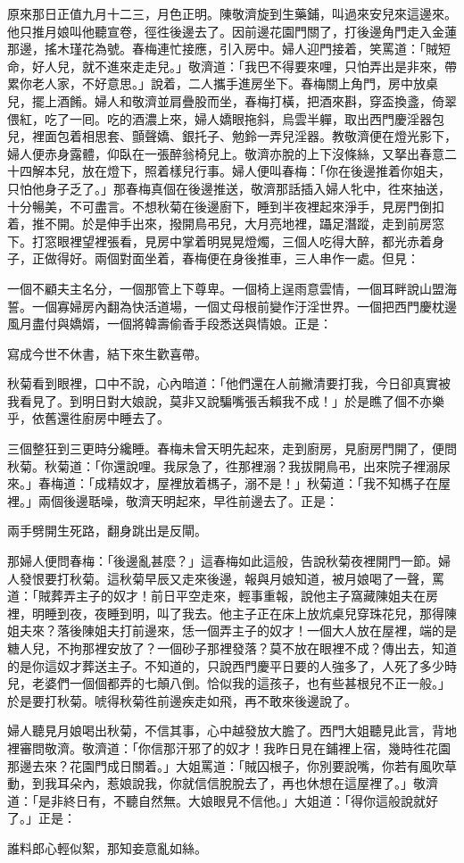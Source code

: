 原來那日正值九月十二三，月色正明。陳敬濟旋到生藥鋪，叫過來安兒來這邊來。他只推月娘叫他聽宣卷，徑徃後邊去了。因前邊花園門關了，打後邊角門走入金蓮那邊，搖木瑾花為號。春梅連忙接應，引入房中。婦人迎門接着，笑罵道：「賊短命，好人兒，就不進來走走兒。」敬濟道：「我巴不得要來哩，只怕弄出是非來，帶累你老人家，不好意思。」說着，二人攜手進房坐下。春梅關上角門，房中放桌兒，擺上酒餚。婦人和敬濟並肩疊股而坐，春梅打橫，把酒來斟，穿盃換盞，倚翠偎紅，吃了一囘。吃的酒濃上來，婦人嬌眼拖斜，烏雲半軃，取出西門慶淫器包兒，裡面包着相思套、顫聲嬌、銀托子、勉鈴一弄兒淫器。{}教敬濟便在燈光影下，婦人便赤身露體，仰臥在一張醉翁椅兒上。敬濟亦脫的上下沒條絲，又拏出春意二十四解本兒，放在燈下，照着樣兒行事。婦人便叫春梅：「你在後邊推着你姐夫，只怕他身子乏了。」那春梅真個在後邊推送，敬濟那話插入婦人牝中，徃來抽送，十分暢美，不可盡言。不想秋菊在後邊廚下，睡到半夜裡起來淨手，見房門倒扣着，推不開。於是伸手出來，撥開鳥弔兒，大月亮地裡，躡足潛蹤，走到前房窓下。打窓眼裡望裡張看，見房中掌着明晃晃燈燭，三個人吃得大醉，都光赤着身子，正做得好。兩個對面坐着，春梅便在身後推車，三人串作一處。{}但見：

一個不顧夫主名分，一個那管上下尊卑。一個椅上逞雨意雲情，一個耳畔說山盟海誓。一個寡婦房內翻為快活道場，一個丈母根前變作汙淫世界。一個把西門慶枕邊風月盡付與嬌婿，一個將韓壽偷香手段悉送與情娘。正是：

寫成今世不休書，結下來生歡喜帶。

秋菊看到眼裡，口中不說，心內暗道：「他們還在人前撇清要打我，今日卻真實被我看見了。到明日對大娘說，莫非又說騙嘴張舌賴我不成！」{}於是瞧了個不亦樂乎，依舊還徃廚房中睡去了。

三個整狂到三更時分纔睡。春梅未曾天明先起來，走到廚房，見廚房門開了，便問秋菊。秋菊道：「你還說哩。我尿急了，徃那裡溺？我拔開鳥弔，出來院子裡溺尿來。」{}春梅道：「成精奴才，屋裡放着榪子，溺不是！」秋菊道：「我不知榪子在屋裡。」兩個後邊聒噪，敬濟天明起來，早徃前邊去了。正是：

兩手劈開生死路，翻身跳出是反閘。

那婦人便問春梅：「後邊亂甚麼？」這春梅如此這般，告說秋菊夜裡開門一節。婦人發恨要打秋菊。這秋菊早辰又走來後邊，報與月娘知道，被月娘喝了一聲，罵道：「賊葬弄主子的奴才！前日平空走來，輕事重報，說他主子窩藏陳姐夫在房裡，明睡到夜，夜睡到明，叫了我去。他主子正在床上放炕桌兒穿珠花兒，那得陳姐夫來？落後陳姐夫打前邊來，恁一個弄主子的奴才！一個大人放在屋裡，端的是糖人兒，不拘那裡安放了？一個砂子那裡發落？莫不放在眼裡不成？傳出去，知道的是你這奴才葬送主子。不知道的，只說西門慶平日要的人強多了，人死了多少時兒，老婆們一個個都弄的七顛八倒。恰似我的這孩子，也有些甚根兒不正一般。」{}於是要打秋菊。唬得秋菊徃前邊疾走如飛，再不敢來後邊說了。

婦人聽見月娘喝出秋菊，不信其事，心中越發放大膽了。{}西門大姐聽見此言，背地裡審問敬濟。敬濟道：「你信那汗邪了的奴才！我昨日見在鋪裡上宿，幾時徃花園那邊去來？花園門成日關着。」大姐罵道：「賊囚根子，你別要說嘴，你若有風吹草動，到我耳朵內，惹娘說我，你就信信脫脫去了，再也休想在這屋裡了。」敬濟道：「是非終日有，不聽自然無。大娘眼見不信他。」{}大姐道：「得你這般說就好了。」正是：

誰料郎心輕似絮，那知妾意亂如絲。

